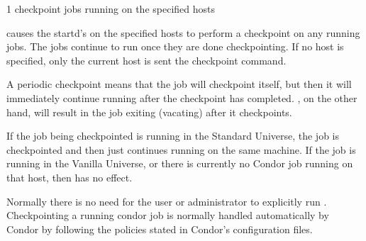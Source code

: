 \begin{ManPage}{\label{man-condor-checkpoint}}{1}
{checkpoint jobs running on the specified hosts}
\Synopsis {}
\ToolArgs


\Description
{} causes the startd's on the specified hosts to perform a 
checkpoint on any running jobs. The jobs continue to run once
they are done checkpointing. If no host is specified, only the current host is sent
the checkpoint command.

A periodic checkpoint means that the job will checkpoint itself, but then it will immediately continue running
after the checkpoint has completed. , on the other hand, will result in the job exiting (vacating) after it
checkpoints. 

If the job being checkpointed is running in the Standard Universe, the job is checkpointed and then just continues running
on the same machine. If the job is running in the Vanilla Universe, or there is currently no Condor job
running on that host, then  has no effect. 

Normally there is no need for the user or administrator to explicitly run . Checkpointing a running condor
job is normally handled automatically by Condor by following the policies stated in Condor's configuration files. 

\begin{Options}
	\ToolArgsDesc
\end{Options}

\end{ManPage}
